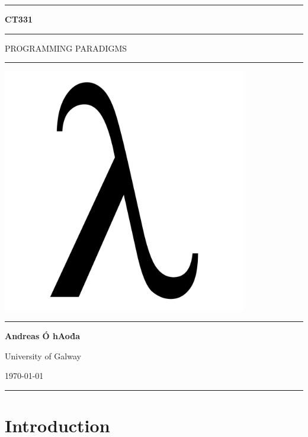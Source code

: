 \documentclass[a4paper,11pt]{article}
\begin{document}
\begin{titlepage}
    \begin{center}
        \hrule
        \vspace*{0.6cm}
        \huge \textbf{CT331}
        \vspace*{0.6cm}
        \hrule
        \LARGE
       \vspace{0.5cm}
       PROGRAMMING PARADIGMS
       \vspace{0.5cm}
       \hrule
            
       \vfill
       \includegraphics[width=0.8\textwidth]{images/lambda.png}
        \vfill

        \Large
       \vspace{0.5cm}
       \hrule
       \vspace{0.5cm}
       \textbf{Andreas Ó hAoḋa}
            
       \normalsize
       University of Galway

       \today

       \vspace{0.5cm}
       \hrule
    \end{center}
\end{titlepage}

\newpage
\tableofcontents
\newpage
\setcounter{page}{1}

\section{Introduction}
\end{document}
